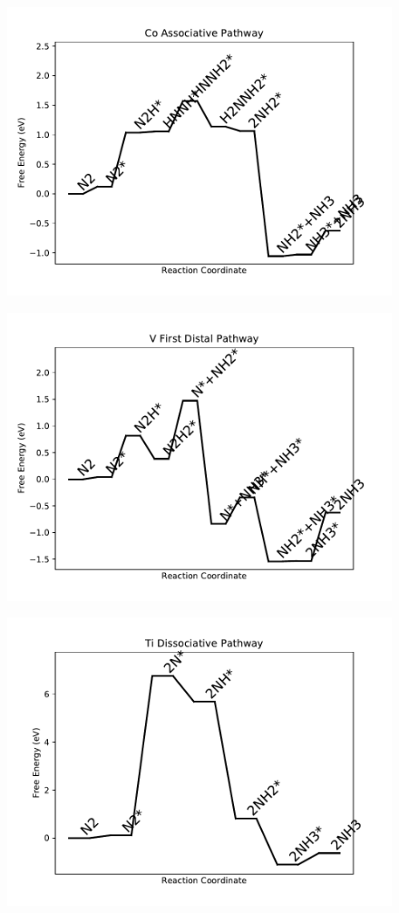 \begin{figure}
\includegraphics[width=0.8\linewidth]{data/plots/Co_associative.pdf}
\end{figure}

\begin{figure}
\includegraphics[width=0.8\linewidth]{data/plots/V_distal_1.pdf}
\end{figure}

\begin{figure}
\includegraphics[width=0.8\linewidth]{data/plots/Ti_dissociative.pdf}
\end{figure}

